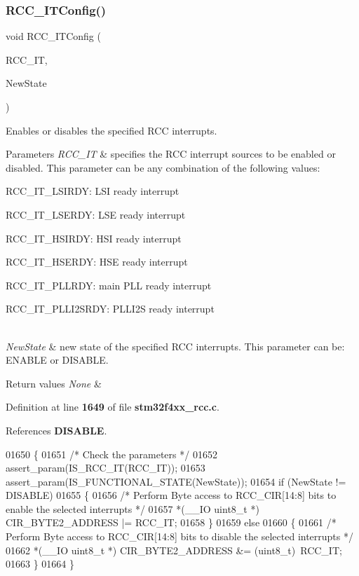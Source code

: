 \subsubsection{R\+C\+C\+\_\+\+I\+T\+Config()}
{\footnotesize\ttfamily void R\+C\+C\+\_\+\+I\+T\+Config (\begin{DoxyParamCaption}\item[{uint8\+\_\+t}]{R\+C\+C\+\_\+\+IT,  }\item[{\textbf{ Functional\+State}}]{New\+State }\end{DoxyParamCaption})}



Enables or disables the specified R\+CC interrupts. 


\begin{DoxyParams}{Parameters}
{\em R\+C\+C\+\_\+\+IT} & specifies the R\+CC interrupt sources to be enabled or disabled. This parameter can be any combination of the following values\+: \begin{DoxyItemize}
\item R\+C\+C\+\_\+\+I\+T\+\_\+\+L\+S\+I\+R\+DY\+: L\+SI ready interrupt \item R\+C\+C\+\_\+\+I\+T\+\_\+\+L\+S\+E\+R\+DY\+: L\+SE ready interrupt \item R\+C\+C\+\_\+\+I\+T\+\_\+\+H\+S\+I\+R\+DY\+: H\+SI ready interrupt \item R\+C\+C\+\_\+\+I\+T\+\_\+\+H\+S\+E\+R\+DY\+: H\+SE ready interrupt \item R\+C\+C\+\_\+\+I\+T\+\_\+\+P\+L\+L\+R\+DY\+: main P\+LL ready interrupt \item R\+C\+C\+\_\+\+I\+T\+\_\+\+P\+L\+L\+I2\+S\+R\+DY\+: P\+L\+L\+I2S ready interrupt \end{DoxyItemize}
\\
\hline
{\em New\+State} & new state of the specified R\+CC interrupts. This parameter can be\+: E\+N\+A\+B\+LE or D\+I\+S\+A\+B\+LE. \\
\hline
\end{DoxyParams}

\begin{DoxyRetVals}{Return values}
{\em None} & \\
\hline
\end{DoxyRetVals}


Definition at line \textbf{ 1649} of file \textbf{ stm32f4xx\+\_\+rcc.\+c}.



References \textbf{ D\+I\+S\+A\+B\+LE}.


\begin{DoxyCode}
01650 \{
01651   \textcolor{comment}{/* Check the parameters */}
01652   assert_param(IS_RCC_IT(RCC\_IT));
01653   assert_param(IS_FUNCTIONAL_STATE(NewState));
01654   \textcolor{keywordflow}{if} (NewState != DISABLE)
01655   \{
01656     \textcolor{comment}{/* Perform Byte access to RCC\_CIR[14:8] bits to enable the selected interrupts */}
01657     *(\_\_IO uint8\_t *) CIR_BYTE2_ADDRESS |= RCC\_IT;
01658   \}
01659   \textcolor{keywordflow}{else}
01660   \{
01661     \textcolor{comment}{/* Perform Byte access to RCC\_CIR[14:8] bits to disable the selected interrupts */}
01662     *(\_\_IO uint8\_t *) CIR_BYTE2_ADDRESS &= (uint8\_t)~RCC\_IT;
01663   \}
01664 \}
\end{DoxyCode}
